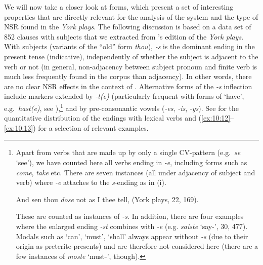 \documentclass[output=paper]{langsci/langscibook}
\begin{document}
We will now take a closer look at \Ssg{} forms, which present a set of interesting properties that are directly relevant for the analysis of the  system and the type of \gls{NSR} found in the \emph{York plays}. The following discussion is based on a data set of 852 clauses with \Ssg{} subjects that we extracted from \cite{Davidson:2011}'s edition of the \emph{York plays}.
With \Ssg{} subjects (variants of the ``old'' form \emph{thou}), \emph{-s} is the
dominant ending in the present tense (indicative), independently of whether the
subject is adjacent to the verb or not (in general, non-adjacency between
subject pronoun and finite verb is much less frequently found in the corpus
than adjacency). In other words, there are no clear \gls{NSR} effects in the context of \Ssg{}. Alternative forms of the
    \emph{-s} inflection include markers extended by \emph{-t(e)} (particularly
    frequent with forms of ‘have’, e.g.\ \emph{hast(e)}, see
    ),\footnote{Apart from verbs that
        are made up by only a single CV-pattern (e.g.\ \emph{se} `see'), we
        have counted here all verbs ending in \emph{-e}, including forms such
        as \emph{come}, \emph{take} etc. There are seven instances (all under
        adjacency of subject and verb) where \emph{-e} attaches to the
        \emph{s}-ending as in (i).

    \begin{exe}
         And sen thou \textit{dose} not as I thee tell,
        \glt (York plays, 22, 169).
    \end{exe}
    These are counted as instances of \emph{-s}. In addition, there are four
    examples where the enlarged ending \emph{-st} combines with \emph{-e} (e.g.
    \emph{saiste} `say-\Ssg{}', 30, 477). Modals such as `can', `must', `shall'
    always appear without \emph{-s} (due to their origin as preterite-presents) and are
    therefore not considered here (there are a few instances of \emph{moste}
‘must-\Ssg{}', though).} and by pre-consonantic vowels (\emph{-es},
\emph{-is}, \emph{-ys}). See  for the quantitative
distribution of the \Ssg{} endings with lexical verbs and (\ref{ex:10:12}--\ref{ex:10:13}) for a
selection of relevant examples.
\end{document}
